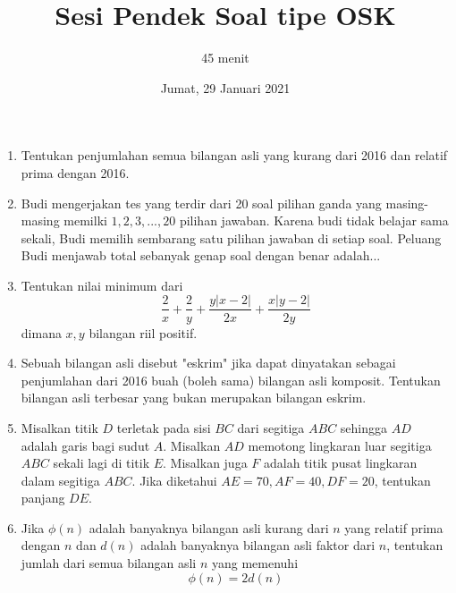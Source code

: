\documentclass{article}
\title{Sesi Pendek Soal tipe OSK}
\author{45 menit}
\date{Jumat, 29 Januari 2021}
\begin{document}
	\maketitle
	
	\begin{enumerate}
		\item
		Tentukan penjumlahan semua bilangan asli yang kurang dari 2016 dan relatif prima dengan 2016.
		
		\item 
		Budi mengerjakan tes yang terdir dari 20 soal pilihan ganda yang masing-masing memilki $1,2,3,...,20$ pilihan jawaban. Karena budi tidak belajar sama sekali, Budi memilih sembarang satu pilihan jawaban di setiap soal. Peluang Budi menjawab total sebanyak genap soal dengan benar adalah...
		
		\item
		Tentukan nilai minimum dari $$\frac{2}{x}+\frac{2}{y}+\frac{y|x-2|}{2x}+\frac{x|y-2|}{2y}$$dimana $x,y$ bilangan riil positif.
		
		\item
		Sebuah bilangan asli disebut "eskrim" jika dapat dinyatakan sebagai penjumlahan dari 2016 buah (boleh sama) bilangan asli komposit. Tentukan bilangan asli terbesar yang bukan merupakan bilangan eskrim.
		
		\item
		Misalkan titik $D$ terletak pada sisi $BC$ dari segitiga $ABC$ sehingga $AD$ adalah garis bagi sudut $A$. Misalkan $AD$ memotong lingkaran luar segitiga $ABC$ sekali lagi di titik $E$. Misalkan juga $F$ adalah titik pusat lingkaran dalam segitiga $ABC$. Jika diketahui $AE=70, AF=40, DF=20$, tentukan panjang $DE$.
		
		\item
		Jika $\phi(n)$ adalah banyaknya bilangan asli kurang dari $n$ yang relatif prima dengan $n$ dan $d(n)$ adalah banyaknya bilangan asli faktor dari $n$, tentukan jumlah dari semua bilangan asli $n$ yang memenuhi $$\phi(n)=2d(n)$$
		
		
	\end{enumerate}
		
\end{document}
